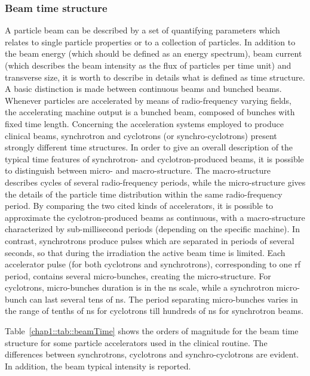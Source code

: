 \subsubsection{Beam time structure}\label{chap1::subsubsection::beamTimeStruct}

A particle beam can be described by a set of quantifying parameters which relates to single particle properties or to a collection of particles. In addition to the beam energy (which should be defined as an energy spectrum), beam current (which describes the beam intensity as the flux of particles per time unit) and transverse size, it is worth to describe in details what is defined as time structure. A basic distinction is made between continuous beams and bunched beams. Whenever particles are accelerated by means of radio-frequency varying fields, the accelerating machine output is a bunched beam, composed of bunches with fixed time length. Concerning the acceleration systems employed to produce clinical beams, synchrotron and cyclotrons (or synchro-cyclotrons) present strongly different time structures. In order to give an overall description of the typical time features of synchrotron- and cyclotron-produced beams, it is possible to distinguish between micro- and macro-structure. The macro-structure describes cycles of several radio-frequency periods, while the micro-structure gives the details of the particle time distribution within the same radio-frequency period. By comparing the two cited kinds of accelerators, it is possible to approximate the cyclotron-produced beams as continuous, with a macro-structure characterized by sub-millisecond periods (depending on the specific machine). In contrast, synchrotrons produce pulses which are separated in periods of several seconds, so that during the irradiation the active beam time is limited. Each accelerator pulse (for both cyclotrons and synchrotrons), corresponding to one \gls{rf} period, contains several micro-bunches, creating the micro-structure. For cyclotrons, micro-bunches duration is in the ns scale, while a synchrotron micro-bunch can last several tens of ns. The period separating micro-bunches varies in the range of tenths of ns for cyclotrons till hundreds of ns for synchrotron beams. 

Table~\ref{chap1::tab::beamTime} shows the orders of magnitude for the beam time structure for some particle accelerators used in the clinical routine. The differences between synchrotrons, cyclotrons and synchro-cyclotrons are evident. In addition, the beam typical intensity is reported.

